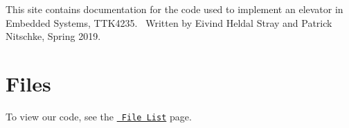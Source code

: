 This site contains documentation for the code used to implement an elevator in Embedded Systems, T\+T\+K4235.~\newline
Written by Eivind Heldal Stray and Patrick Nitschke, Spring 2019.\hypertarget{index_section1}{}\section{Files}\label{index_section1}
To view our code, see the \href{files.html}{\texttt{ File List}} page. 